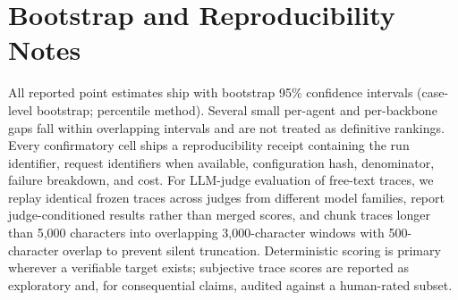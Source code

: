 \documentclass[letterpaper]{article} %
\begin{document}
\section{Bootstrap and Reproducibility Notes}
\label{app:repro-notes}

All reported point estimates ship with bootstrap 95\% confidence intervals
(case-level bootstrap; percentile method). Several small per-agent and
per-backbone gaps fall within overlapping intervals and are not treated as
definitive rankings. Every confirmatory cell ships a reproducibility receipt
containing the run identifier, request identifiers when available, configuration
hash, denominator, failure breakdown, and cost. For LLM-judge evaluation of
free-text traces, we replay identical frozen traces across judges from different
model families, report judge-conditioned results rather than merged scores, and
chunk traces longer than 5,000 characters into overlapping 3,000-character
windows with 500-character overlap to prevent silent truncation. Deterministic
scoring is primary wherever a verifiable target exists; subjective trace scores
are reported as exploratory and, for consequential claims, audited against a
human-rated subset.
\end{document}
